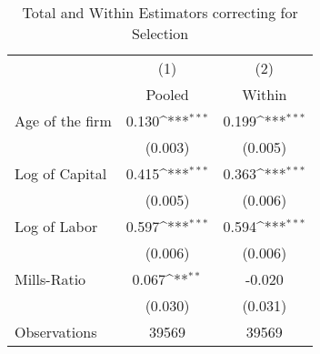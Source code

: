\begin{table}[htbp]\centering
\def\sym#1{\ifmmode^{#1}\else\(^{#1}\)\fi}
\caption{Total and Within Estimators correcting for Selection}
\begin{tabular}{l*{2}{c}}
\toprule
                    &\multicolumn{1}{c}{(1)}&\multicolumn{1}{c}{(2)}\\
                    &\multicolumn{1}{c}{Pooled}&\multicolumn{1}{c}{Within}\\
\midrule
Age of the firm     &       0.130\sym{***}&       0.199\sym{***}\\
                    &     (0.003)         &     (0.005)         \\
\addlinespace
Log of Capital      &       0.415\sym{***}&       0.363\sym{***}\\
                    &     (0.005)         &     (0.006)         \\
\addlinespace
Log of Labor        &       0.597\sym{***}&       0.594\sym{***}\\
                    &     (0.006)         &     (0.006)         \\
\addlinespace
Mills-Ratio         &       0.067\sym{**} &      -0.020         \\
                    &     (0.030)         &     (0.031)         \\
\midrule
Observations        &       39569         &       39569         \\
\bottomrule
\end{tabular}
\end{table}
